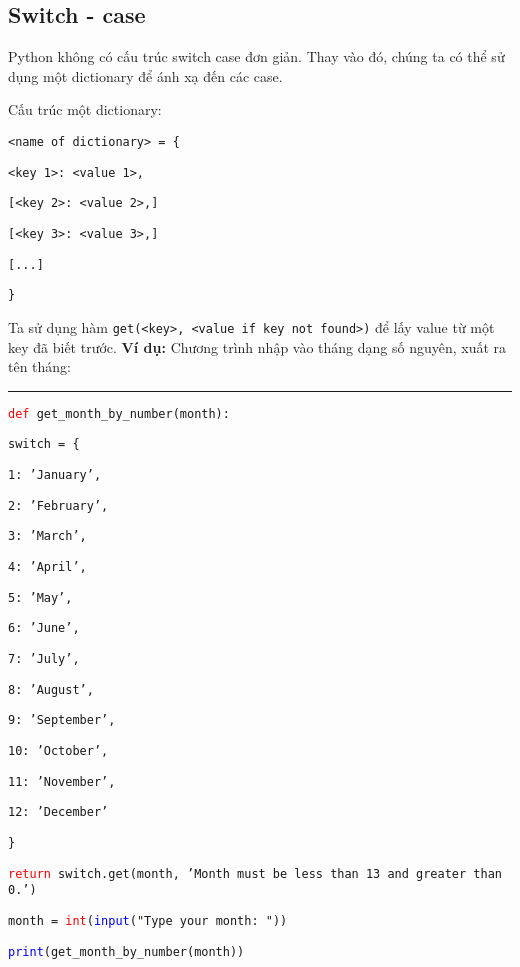 \subsection{Switch - case}
Python không có cấu trúc switch case đơn giản. Thay vào đó, chúng ta có thể sử dụng một dictionary để ánh xạ đến các case.\par
Cấu trúc một dictionary:\par
\texttt{<name of dictionary> = \{}\par
\qquad \texttt{<key 1>: <value 1>,}\par
\qquad \texttt{[<key 2>: <value 2>,]}\par
\qquad \texttt{[<key 3>: <value 3>,]}\par
\qquad \texttt{[...]}\par
\texttt{\}}\par
Ta sử dụng hàm \texttt{get(<key>, <value if key not found>)} để lấy value từ một key đã biết trước.
\newpage
\textbf{Ví dụ:} Chương trình nhập vào tháng dạng số nguyên, xuất ra tên tháng:\\
\rule{\linewidth}{0.2mm}\par
\begin{linenumbers}
	\texttt{\textcolor{red}{def} get\_month\_by\_number(month):}\par
	\qquad \texttt{switch = \{}\par
	\qquad \qquad \texttt{1: 'January',}\par
	\qquad \qquad \texttt{2: 'February',}\par
	\qquad \qquad \texttt{3: 'March',}\par
	\qquad \qquad \texttt{4: 'April',}\par
	\qquad \qquad \texttt{5: 'May',}\par
	\qquad \qquad \texttt{6: 'June',}\par
	\qquad \qquad \texttt{7: 'July',}\par
	\qquad \qquad \texttt{8: 'August',}\par
	\qquad \qquad \texttt{9: 'September',}\par
	\qquad \qquad \texttt{10: 'October',}\par
	\qquad \qquad \texttt{11: 'November',}\par
	\qquad \qquad \texttt{12: 'December'}\par
	\qquad \texttt{\}}\par
	\qquad \texttt{\textcolor{red}{return}  switch.get(month, 'Month must be less than 13 and greater than 0.')}\par
	\bigskip
	\texttt{month = \textcolor{red}{int}(\textcolor{blue}{input}("Type your month: "))}\par
	\texttt{\textcolor{blue}{print}(get\_month\_by\_number(month))}\par
\end{linenumbers}
